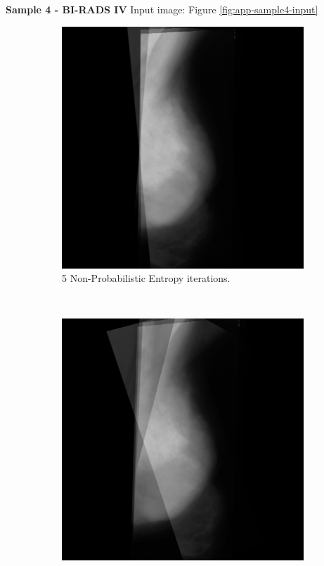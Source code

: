 \newpage \noindent \textbf{Sample 4 - BI-RADS IV}
Input image: Figure \ref{fig:app-sample4-input}

\begin{figure}[H]
    \centering
    \begin{subfigure}[t]{0.3\textwidth}
        \includegraphics[width=\textwidth]{Appendix5/sample4/nonProb/scan_5.png}
        \caption{5 Non-Probabilistic Entropy iterations.}
        \label{fig:app-5-nonProb-sample4}
    \end{subfigure} \hfill
    ~ %
    \begin{subfigure}[t]{0.3\textwidth}
      \includegraphics[width=\textwidth]{Appendix5/sample4/nonProb/scan_10.png}

\end{subfigure}
\end{figure}
